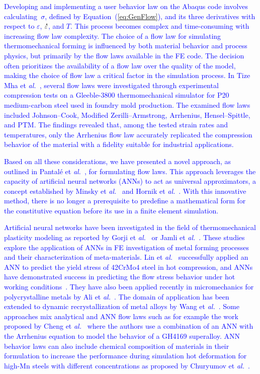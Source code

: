 \documentclass[algorithms,article,submit,pdftex,oneauthors]{Definitions/mdpi}
\makeatletter
\DeclareRobustCommand{\mdot}[1]{\accentset{\mbox{\bfseries .}}{#1}}
\DeclareRobustCommand{\eal}{et \emph{al.}\@\xspace}
\makeatother
\begin{document}
\textcolor{blue}{Developing and implementing a user behavior law on the Abaqus code involves calculating~$\sigma$, defined by Equation~(\ref{eq:GenFlow}), and its three derivatives with respect to $\varepsilon$, $\mdot{\varepsilon}$, and $T$.
This process becomes complex and time-consuming with increasing flow law complexity.
The choice of a flow law for simulating thermomechanical forming is influenced by both material behavior and process physics, but primarily by the flow laws available in the FE code.
The decision often prioritizes the availability of a flow law over the quality of the model, making the choice of flow law a critical factor in the simulation process.
In Tize Mha \eal~\cite{Tize-2023-IEP}, several flow laws were investigated through experimental compression tests on a Gleeble-3800 thermomechanical simulator for P20 medium-carbon steel used in foundry mold production.
The examined flow laws included Johnson--Cook, Modified Zerilli--Armstrong, Arrhenius, Hensel--Spittle, and PTM.
The findings revealed that, among the tested strain rates and temperatures, only the Arrhenius flow law accurately replicated the compression behavior of the material with a fidelity suitable for industrial applications.}

\textcolor{blue}{Based on all these considerations, we have presented a novel approach, as outlined in Pantalé \eal~\cite{Pantale-2021-EIN, Pantale-2023-DIA}, for formulating flow laws.
This approach leverages the capacity of artificial neural networks (ANNs) to act as universal approximators, a concept established by Minsky \eal~\cite{Minsky-1969-PIC} and Hornik \eal~\cite{Hornik-1989-MFN}.
With this innovative method, there is no longer a prerequisite to predefine a mathematical form for the constitutive equation before its use in a finite element simulation.}

\textcolor{blue}{Artificial neural networks have been investigated in the field of thermomechanical plasticity modeling as reported by Gorji \eal~\cite{Gorji-2020} or Jamli \eal~\cite{Jamli-2019-SNN}. 
These studies explore the application of ANNs in FE investigation of metal forming processes and their characterization of meta-materials. 
Lin \eal~\cite{Lin-2008} successfully applied an ANN to predict the yield stress of 42CrMo4 steel in hot compression, and ANNs have demonstrated success in predicting the flow stress behavior under hot working conditions~\cite{Stoffel-2018-ANN, Stoffel-2019-NNB}.
They have also been applied recently in micromechanics for polycrystalline metals by Ali \eal~\cite{Ali-2019-AAN}.
The domain of application has been extended to dynamic recrystallization of metal alloys by Wang \eal~\cite{Wang-2021-ANN}.
Some approaches mix analytical and ANN flow laws such as for example the work proposed by Cheng \eal~\cite{Cheng-2022-CWD} where the authors use a combination of an ANN with the Arrhenius equation to model the behavior of a GH4169 superalloy.
ANN behavior laws can also include chemical composition of materials in their formulation to increase the performance during simulation hot deformation for high-Mn steels with different concentrations as proposed by Churyumov \eal~\cite{Churyumov-2023-PTS}.}
\end{document}
